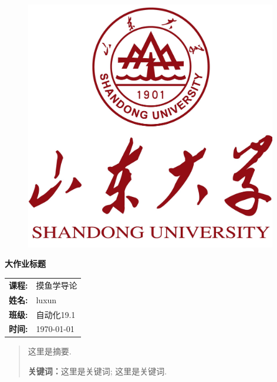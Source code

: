 \documentclass[12pt, a4paper, oneside]{ctexart}
\begin{document}
\thispagestyle{empty}

\begin{figure}[t]
    \centering
    \includegraphics[width=11cm]{logo3.png}
\end{figure}

\vspace*{\fill}
    \begin{center}
        \Huge\textbf{大作业标题}
    \end{center}
\vspace*{\fill}

\begin{table}[b]
    \centering
    \large
    \begin{tabular}{ll}
    \textbf{课程:} & 摸鱼学导论 \\
    \textbf{姓名:} & luxun \\
    \textbf{班级:} & 自动化19.1 \\
    \textbf{时间:} & \today \\
    \end{tabular}
\end{table}


\newpage

\thispagestyle{empty}
\begin{abstract}
    这里是摘要. 
    \par\textbf{关键词：}这里是关键词; 这里是关键词. 
\end{abstract}

\newpage
\thispagestyle{plain}
\setcounter{page}{1}
\tableofcontents
\end{document}
